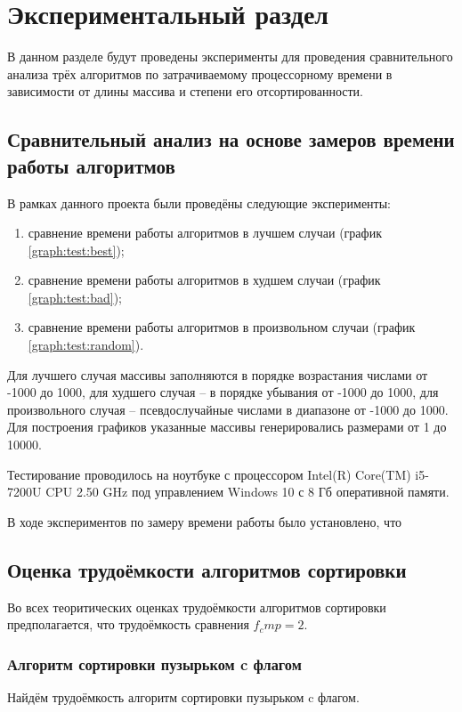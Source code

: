 \chapter{Экспериментальный раздел}
\label{cha:research}
    В данном разделе будут проведены эксперименты для проведения 
    сравнительного анализа трёх алгоритмов по затрачиваемому процессорному 
    времени в зависимости от длины массива и степени его отсортированности.

    \section{Сравнительный анализ на основе замеров времени работы алгоритмов}
        В рамках данного проекта были проведёны следующие эксперименты:
        \begin{enumerate}
            \item сравнение времени работы алгоритмов в лучшем случаи (график \ref{graph:test:best});
            \item сравнение времени работы алгоритмов в худшем случаи (график \ref{graph:test:bad});
            \item сравнение времени работы алгоритмов в произвольном случаи (график \ref{graph:test:random}).
        \end{enumerate}

        Для лучшего случая массивы заполняются в порядке возрастания числами от -1000 до 1000,
        для худшего случая -- в порядке убывания от -1000 до 1000, для произвольного случая --
        псевдослучайные числами в диапазоне от -1000 до 1000. Для построения графиков 
        указанные массивы генерировались размерами от 1 до 10000.

        Тестирование проводилось на ноутбуке с процессором
        Intel(R) Core(TM) i5-7200U CPU 2.50 GHz \cite{processor-i5-7200u}
        под управлением Windows 10 с 8 Гб оперативной памяти.

        В ходе экспериментов по замеру времени работы было установлено, что 
          

    \section{Оценка трудоёмкости алгоритмов сортировки}
        Во всех теоритических оценках трудоёмкости
        алгоритмов сортировки предполагается, что
        трудоёмкость сравнения $ f_cmp = 2 $.

        \subsection{Алгоритм сортировки пузырьком c флагом}
            Найдём трудоёмкость алгоритм сортировки пузырьком c флагом.
            
